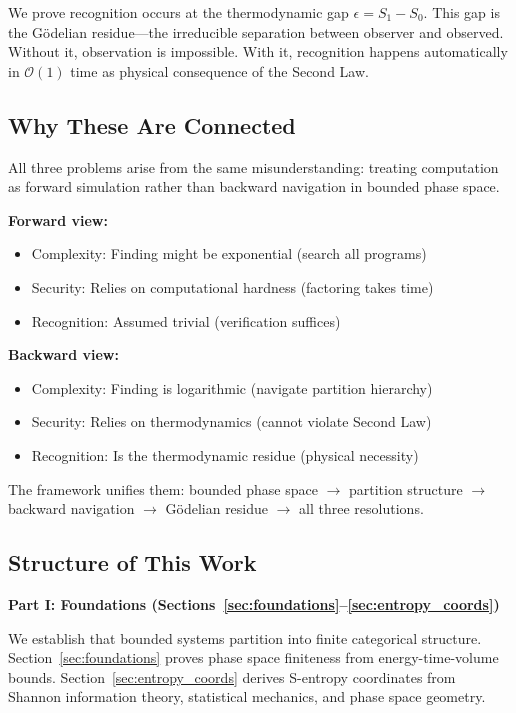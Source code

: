 \documentclass[twocolumn,10pt]{article}
\theoremstyle{definition}
\theoremstyle{remark}
\newcommand{\bigO}{\mathcal{O}}
\begin{document}
\vspace{0.2cm}
\noindent We prove recognition occurs at the thermodynamic gap $\epsilon = S_1 - S_0$. This gap is the Gödelian residue—the irreducible separation between observer and observed. Without it, observation is impossible. With it, recognition happens automatically in $\bigO(1)$ time as physical consequence of the Second Law\cite{landauer1961}.

\subsection{Why These Are Connected}

All three problems arise from the same misunderstanding: treating computation as forward simulation rather than backward navigation in bounded phase space.

\vspace{0.2cm}
\noindent\textbf{Forward view:}
\begin{itemize}
\item Complexity: Finding might be exponential (search all programs)
\item Security: Relies on computational hardness (factoring takes time)
\item Recognition: Assumed trivial (verification suffices)
\end{itemize}

\textbf{Backward view:}
\begin{itemize}
\item Complexity: Finding is logarithmic (navigate partition hierarchy)
\item Security: Relies on thermodynamics (cannot violate Second Law)
\item Recognition: Is the thermodynamic residue (physical necessity)
\end{itemize}

\vspace{0.2cm}
\noindent The framework unifies them: bounded phase space $\to$ partition structure $\to$ backward navigation $\to$ Gödelian residue $\to$ all three resolutions.

\subsection{Structure of This Work}

\textbf{Part I: Foundations (Sections~\ref{sec:foundations}--\ref{sec:entropy_coords})}

We establish that bounded systems partition into finite categorical structure. Section~\ref{sec:foundations} proves phase space finiteness from energy-time-volume bounds. Section~\ref{sec:entropy_coords} derives S-entropy coordinates from Shannon information theory\cite{shannon1948}, statistical mechanics\cite{boltzmann1877}, and phase space geometry.
\end{document}
